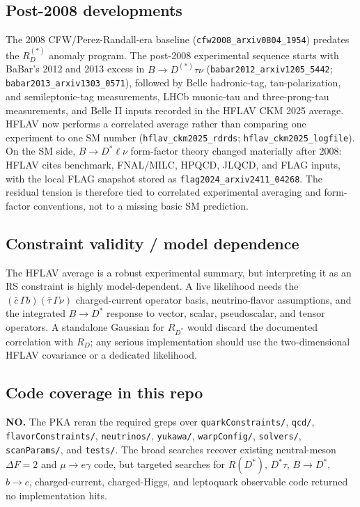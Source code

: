 \subsection*{Post-2008 developments}
The 2008 CFW/Perez-Randall-era baseline
(\texttt{cfw2008\_arxiv0804\_1954}) predates the \(R_D^{(*)}\) anomaly
program.  The post-2008 experimental sequence starts with BaBar's 2012 and
2013 excess in \(B\to D^{(*)}\tau\nu\)
(\texttt{babar2012\_arxiv1205\_5442};
\texttt{babar2013\_arxiv1303\_0571}), followed by Belle hadronic-tag,
tau-polarization, and semileptonic-tag measurements, LHCb muonic-tau and
three-prong-tau measurements, and Belle II inputs recorded in the HFLAV CKM
2025 average.  HFLAV now performs a correlated average rather than comparing
one experiment to one SM number (\texttt{hflav\_ckm2025\_rdrds};
\texttt{hflav\_ckm2025\_logfile}).  On the SM side,
\(B\to D^*\ell\nu\) form-factor theory changed materially after 2008: HFLAV
cites benchmark, FNAL/MILC, HPQCD, JLQCD, and FLAG inputs, with the local FLAG
snapshot stored as \texttt{flag2024\_arxiv2411\_04268}.  The residual tension
is therefore tied to correlated experimental averaging and form-factor
conventions, not to a missing basic SM prediction.

\subsection*{Constraint validity / model dependence}
The HFLAV average is a robust experimental summary, but interpreting it as an
RS constraint is highly model-dependent.  A live likelihood needs the
\((\bar c\,\Gamma b)(\bar\tau\,\Gamma\nu)\) charged-current operator basis,
neutrino-flavor assumptions, and the integrated \(B\to D^*\) response to
vector, scalar, pseudoscalar, and tensor operators.  A standalone Gaussian for
\(R_{D^*}\) would discard the documented correlation with \(R_D\); any serious
implementation should use the two-dimensional HFLAV covariance or a dedicated
likelihood.

\subsection*{Code coverage in this repo}
\textbf{NO.}  The PKA reran the required greps over
\texttt{quarkConstraints/}, \texttt{qcd/}, \texttt{flavorConstraints/},
\texttt{neutrinos/}, \texttt{yukawa/}, \texttt{warpConfig/},
\texttt{solvers/}, \texttt{scanParams/}, and \texttt{tests/}.  The broad
searches recover existing neutral-meson \(\Delta F=2\) and
\(\mu\to e\gamma\) code, but targeted searches for \(R(D^*)\), \(D^*\tau\),
\(B\to D^*\), \(b\to c\), charged-current, charged-Higgs, and leptoquark
observable code returned no implementation hits.


